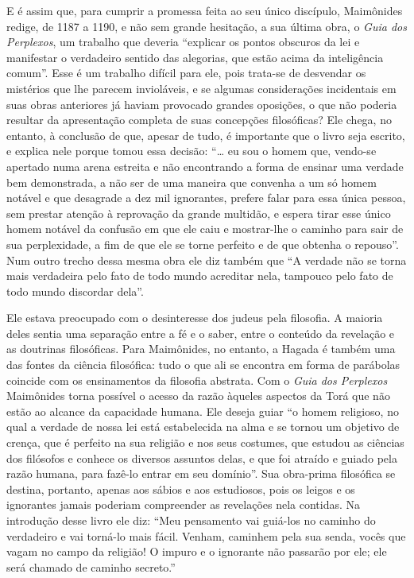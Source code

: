 E é assim que, para cumprir a promessa feita ao seu único discípulo,
Maimônides redige, de 1187 a 1190, e não sem grande hesitação, a sua
última obra, o \emph{Guia dos Perplexos}, um trabalho que deveria
``explicar os pontos obscuros da lei e manifestar o verdadeiro sentido
das alegorias, que estão acima da inteligência comum''. Esse é um
trabalho difícil para ele, pois trata-se de desvendar os mistérios que
lhe parecem invioláveis, e se algumas considerações incidentais em suas
obras anteriores já haviam provocado grandes oposições, o que não
poderia resultar da apresentação completa de suas concepções
filosóficas? Ele chega, no entanto, à conclusão de que, apesar de tudo,
é importante que o livro seja escrito, e explica nele porque tomou essa
decisão: ``\ldots{} eu sou o homem que, vendo-se apertado numa arena estreita
e não encontrando a forma de ensinar uma verdade bem demonstrada, a não
ser de uma maneira que convenha a um só homem notável e que desagrade a
dez mil ignorantes, prefere falar para essa única pessoa, sem prestar
atenção à reprovação da grande multidão, e espera tirar esse único
homem notável da confusão em que ele caiu e mostrar-lhe o caminho para
sair de sua perplexidade, a fim de que ele se torne perfeito e de que
obtenha o repouso''. Num outro trecho dessa mesma obra ele diz também
que ``A verdade não se torna mais verdadeira pelo fato de todo mundo
acreditar nela, tampouco pelo fato de todo mundo discordar dela''.

Ele estava preocupado com o desinteresse dos judeus pela filosofia. A
maioria deles sentia uma separação entre a fé e o saber, entre o
conteúdo da revelação e as doutrinas filosóficas. Para Maimônides, no
entanto, a Hagada é também uma das fontes da ciência filosófica: tudo o
que ali se encontra em forma de parábolas coincide com os ensinamentos
da filosofia abstrata. Com o \emph{Guia dos Perplexos} Maimônides torna
possível o acesso da razão àqueles aspectos da Torá que não
estão ao alcance da capacidade humana. Ele deseja guiar ``o homem
religioso, no qual a verdade de nossa lei está estabelecida na alma e se
tornou um objetivo de crença, que é perfeito na sua religião e nos seus
costumes, que estudou as ciências dos filósofos e conhece os diversos
assuntos delas, e que foi atraído e guiado pela razão humana, para
fazê-lo entrar em seu domínio''. Sua obra-prima filosófica se destina,
portanto, apenas aos sábios e aos estudiosos, pois os leigos e os
ignorantes jamais poderiam compreender as revelações nela contidas. Na
introdução desse livro ele diz: ``Meu pensamento vai guiá-los no caminho
do verdadeiro e vai torná-lo mais fácil. Venham, caminhem pela sua
senda, vocês que vagam no campo da religião! O impuro e o ignorante não
passarão por ele; ele será chamado de caminho secreto.''

